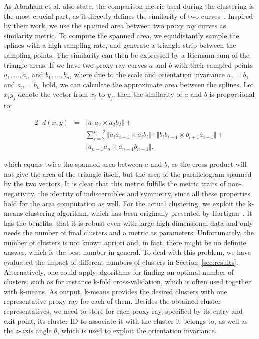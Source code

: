 \documentclass[review,journal]{vgtc}         %
\begin{document}
As Abraham et al. also state, the comparison metric used during the clustering is the most crucial part, as it directly defines the similarity of two curves~\cite{abraham03clustering}. Inspired by their work, we use the spanned area between two proxy ray curves as similarity metric. To compute the spanned area, we equidistantly sample the splines with a high sampling rate, and generate a triangle strip between the sampling points. The similarity can then be expressed by a Riemann sum of the triangle areas. If we have two proxy ray curves $a$ and $b$ with their sampled points $a_1,\dots,a_n$ and $b_1,\dots,b_n$, where due to the scale and orientation invariance $a_1=b_1$ and $a_n=b_n$ hold, we can calculate the approximate area between the splines. Let $x_iy_j$ denote the vector from $x_i$ to $y_j$, then the similarity of $a$ and $b$ is proportional to:

\begin{eqnarray*}
2\cdot d(x,y) &=& \Vert a_1a_2 \times a_2b_2\Vert + \\
&& \sum_{i=2}^{n-2}\Vert a_ia_{i+1} \times a_ib_i \Vert + \Vert b_ib_{i+1} \times b_{i+1}a_{i+1}\Vert + \\
&& \Vert a_{n-1}a_n \times a_{n-1}b_{n-1}\Vert,
\end{eqnarray*}

\noindent which equals twice the spanned area between $a$ and $b$, as the cross product will not give the area of the triangle itself, but the area of the parallelogram spanned by the two vectors. It is clear that this metric fulfills the metric traits of non-negativity, the identity of indiscernibles and symmetry, since all these properties hold for the area computation as well. For the actual clustering, we exploit the k-means clustering algorithm, which has been originally presented by Hartigan~\cite{hartigan75kmeans}. It has the benefits, that it is robust even with large high-dimensional data and only needs the number of final clusters and a metric as parameters. Unfortunately, the number of clusters is not known apriori and, in fact, there might be no definite answer, which is the best number in general. To deal with this problem, we have evaluated the impact of different numbers of clusters in Section~\ref{sec:results}. Alternatively, one could apply algorithms for finding an optimal number of clusters, such as for instance k-fold cross-validation, which is often used together with k-means. As output, k-means provides the desired clusters with one representative proxy ray for each of them. Besides the obtained cluster representatives, we need to store for each proxy ray, specified by its entry and exit point, its cluster ID to associate it with the cluster it belongs to, as well as the $z$-axis angle $\theta$, which is used to exploit the orientation invariance.
\end{document}
